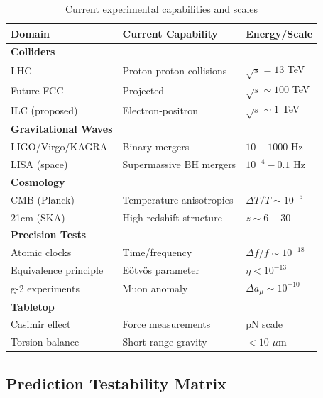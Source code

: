 \begin{table}[H]
\centering
\small
\begin{tabular}{lll}
\toprule
\textbf{Domain} & \textbf{Current Capability} & \textbf{Energy/Scale} \\
\midrule
\textbf{Colliders} & & \\
LHC & Proton-proton collisions & $\sqrt{s} = 13$ TeV \\
Future FCC & Projected & $\sqrt{s} \sim 100$ TeV \\
ILC (proposed) & Electron-positron & $\sqrt{s} \sim 1$ TeV \\
\midrule
\textbf{Gravitational Waves} & & \\
LIGO/Virgo/KAGRA & Binary mergers & $10-1000$ Hz \\
LISA (space) & Supermassive BH mergers & $10^{-4}-0.1$ Hz \\
\midrule
\textbf{Cosmology} & & \\
CMB (Planck) & Temperature anisotropies & $\Delta T/T \sim 10^{-5}$ \\
21cm (SKA) & High-redshift structure & $z \sim 6-30$ \\
\midrule
\textbf{Precision Tests} & & \\
Atomic clocks & Time/frequency & $\Delta f/f \sim 10^{-18}$ \\
Equivalence principle & E\"otv\"os parameter & $\eta < 10^{-13}$ \\
g-2 experiments & Muon anomaly & $\Delta a_\mu \sim 10^{-10}$ \\
\midrule
\textbf{Tabletop} & & \\
Casimir effect & Force measurements & pN scale \\
Torsion balance & Short-range gravity & $< 10$ $\mu$m \\
\bottomrule
\end{tabular}
\caption{Current experimental capabilities and scales}
\end{table}

\subsection{Prediction Testability Matrix}

